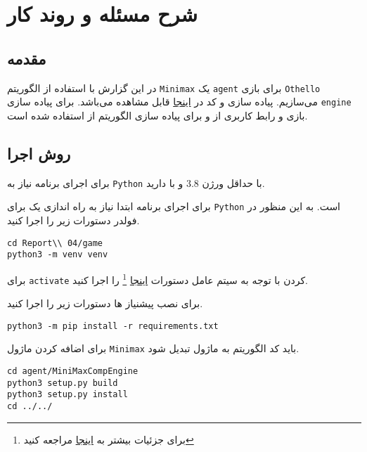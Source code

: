 \chapter{شرح مسئله و روند کار}

\section{مقدمه}
در این گزارش با استفاده از الگوریتم 
\verb;Minimax;
یک
\verb;agent;
برای بازی
\verb;Othello;
می‌سازیم.
پیاده سازی و کد در
\href{https://github.com/atrin-hojjat/Uni-AI-Course-Reports/blob/main/Report\%2004/}{اینجا}
قابل مشاهده می‌باشد.
برای پیاده سازی
\verb;engine;
بازی و رابط کاربری از 
و برای پیاده سازی الگوریتم از
استفاده شده است.

\section{روش اجرا}
برای اجرای برنامه نیاز به 
\verb;Python;
با حداقل ورژن 
$3.8$
و 
با
دارید.

برای اجرای برنامه ابتدا نیاز به راه اندازی یک
برای 
\verb;Python;
است.
به این منظور در فولدر
دستورات زیر را اجرا کنید.

\lstset{language=bash}
\begin{latin}
\begin{lstlisting}
cd Report\\ 04/game
python3 -m venv venv
\end{lstlisting}
\end{latin}

برای 
\verb;activate;
کردن با توجه به سیتم عامل دستورات
\href{https://packaging.python.org/guides/installing-using-pip-and-virtual-environments/}{اینجا}
\footnote{برای جزئیات بیشتر به 
\href{https://docs.python.org/3/library/venv.html}{اینجا}
 مراجعه کنید
 }
را اجرا کنید.

برای نصب پیشنیاز ها دستورات زیر را اجرا کنید.

\begin{latin}
\begin{lstlisting}
python3 -m pip install -r requirements.txt
\end{lstlisting}
\end{latin}

برای اضافه کردن ماژول 
\verb;Minimax;
باید کد 
الگوریتم به ماژول 
تبدیل شود.

\begin{latin}
\begin{lstlisting}
cd agent/MiniMaxCompEngine
python3 setup.py build
python3 setup.py install
cd ../../
\end{lstlisting}
\end{latin}

